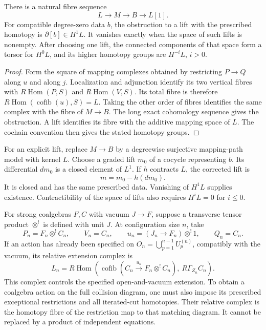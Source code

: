 \begin{theorem}
\label{thm:vacuum-relative-extension}
There is a natural fibre sequence
\[
 L\longrightarrow M\longrightarrow B\longrightarrow L[1].
\]
For compatible degree-zero data \(b\), the obstruction to a
lift with the prescribed homotopy is
\(\partial[b]\in H^1L\).  It vanishes exactly when the space of
such lifts is nonempty.  After choosing one lift, the connected
components of that space form a torsor for \(H^0L\), and its
higher homotopy groups are \(H^{-i}L\), \(i>0\).
\end{theorem}
\begin{proof}
Form the square of mapping complexes obtained by restricting
\(P\to Q\) along \(u\) and along \(j\).  Localization and
adjunction identify its two vertical fibres with
\(R\operatorname{Hom}(P,S)\) and
\(R\operatorname{Hom}(V,S)\).  Its total fibre is therefore
\(R\operatorname{Hom}(\operatorname{cofib}(u),S)=L\).
Taking the other order of fibres identifies the same complex
with the fibre of \(M\to B\).  The long exact cohomology
sequence gives the obstruction.  A lift identifies its fibre
with the additive mapping space of \(L\).  The cochain convention
then gives the stated homotopy groups.
\end{proof}

For an explicit lift, replace \(M\to B\) by a degreewise
surjective mapping-path model with kernel \(L\).  Choose a
graded lift \(m_0\) of a cocycle representing \(b\).  Its
differential \(dm_0\) is a closed element of \(L^1\).  If
\(h\) contracts \(L\), the corrected lift is
\[
 m=m_0-h(dm_0).
\]
It is closed and has the same prescribed data.  Vanishing of
\(H^1L\) supplies existence.  Contractibility of the space of
lifts also requires \(H^iL=0\) for \(i\leq0\).

For strong coalgebras \(F,C\) with vacuum \(J\to F\), suppose
a transverse tensor product \(\otimes^!\) is defined with unit
\(J\).  At configuration size \(n\), take
\[
 P_n=F_n\otimes^!C_n,\qquad V_n=C_n,
 \qquad u_n=({J_n\to F_n})\otimes^!1,
 \qquad Q_n=C_n.
\]
If an action has already been specified on
\(O_n=\bigcup_{p=1}^{n-1}U_p^{(n)}\), compatibly with the vacuum,
its relative extension complex is
\begin{equation}
 L_n=R\operatorname{Hom}
 \left(\operatorname{cofib}(C_n\xrightarrow{u_n}
        F_n\otimes^!C_n),\ R\Gamma_{Z_n}C_n\right).
 \label{eq:vacuum-action-obstruction}
\end{equation}
This complex controls the specified open-and-vacuum extension.
To obtain a coalgebra action on the full collision diagram, one
must also impose its prescribed exceptional restrictions and
all iterated-cut homotopies.  Their relative complex is the
homotopy fibre of the restriction map to that matching diagram.
It cannot be replaced by a product of independent equations.

